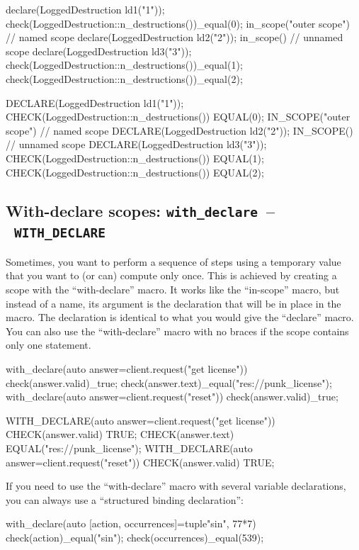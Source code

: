 \documentclass[twoside, a4paper, article]{memoir}
\newcommand*\testudocolor{\color{red!80!blue}}
\newcommand*\testudo[1]{\texttt{\testudocolor{}#1}}
\newcommand*\testudopair[2]{\testudo{#1}~--~\testudo{#2}}
\newcommand\subsectiontestudopair[3]{%
  \subsection[#1]{#1: \testudopair{#2}{#3}}}
\begin{document}
\begin{cpplisting}
declare(LoggedDestruction ld1("1"));
check(LoggedDestruction::n_destructions())_equal(0);
in_scope("outer scope") { // named scope
  declare(LoggedDestruction ld2("2"));
  in_scope() { // unnamed scope
    declare(LoggedDestruction ld3("3"));
  }
  check(LoggedDestruction::n_destructions())_equal(1);
}
check(LoggedDestruction::n_destructions())_equal(2);
\end{cpplisting}

\begin{cpplisting}
DECLARE(LoggedDestruction ld1("1"));
CHECK(LoggedDestruction::n_destructions()) EQUAL(0);
IN_SCOPE("outer scope") // named scope
{
  DECLARE(LoggedDestruction ld2("2"));
  IN_SCOPE() // unnamed scope
  {
    DECLARE(LoggedDestruction ld3("3"));
  }
  CHECK(LoggedDestruction::n_destructions()) EQUAL(1);
}
CHECK(LoggedDestruction::n_destructions()) EQUAL(2);
\end{cpplisting}

\subsectiontestudopair{With-declare scopes}{with\_declare}{WITH\_DECLARE}
\label{sec:with-declare-scopes}

Sometimes, you want to perform a sequence of steps using a temporary value that
you want to (or can) compute only once.  This is achieved by creating a scope
with the ``with-declare'' macro.  It works like the ``in-scope'' macro, but
instead of a name, its argument is the declaration that will be in place in the
macro.  The declaration is identical to what you would give the ``declare''
macro.  You can also use the ``with-declare'' macro with no braces if the scope
contains only one statement.

\begin{cpplisting}
with_declare(auto answer=client.request("get license")) {
  check(answer.valid)_true;
  check(answer.text)_equal("res://punk_license");
}
with_declare(auto answer=client.request("reset"))
  check(answer.valid)_true;
\end{cpplisting}

\begin{cpplisting}
WITH_DECLARE(auto answer=client.request("get license"))
{
  CHECK(answer.valid) TRUE;
  CHECK(answer.text) EQUAL("res://punk_license");
}
WITH_DECLARE(auto answer=client.request("reset"))
  CHECK(answer.valid) TRUE;
\end{cpplisting}

If you need to use the ``with-declare'' macro with several variable
declarations, you can always use a ``structured binding declaration'':
\begin{cpplisting}
with_declare(auto [action, occurrences]=tuple{"sin", 77*7}) {
  check(action)_equal("sin");
  check(occurrences)_equal(539);
}
\end{cpplisting}
\end{document}
